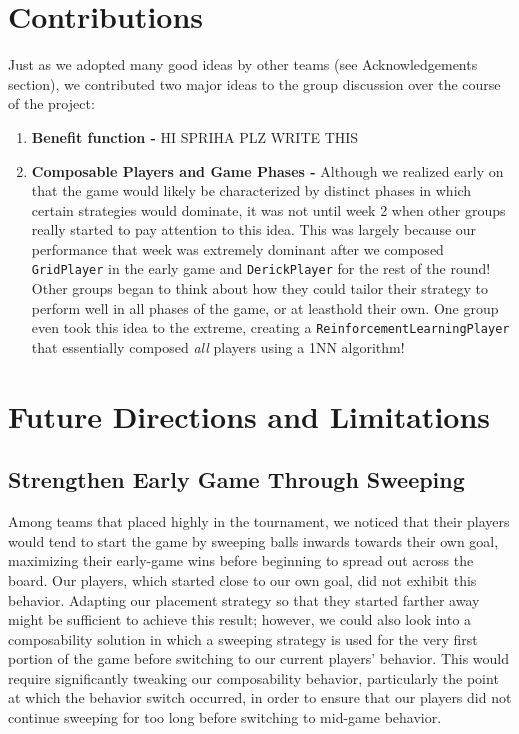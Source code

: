 \documentclass[
10pt, %
letterpaper, %
oneside, %
headinclude,footinclude, %
english
]{article}
\begin{document}
\lipsum[3]

\section{Contributions}

Just as we adopted many good ideas by other teams (see Acknowledgements section), we contributed two major ideas to the group discussion over the course of the project:

\begin{enumerate}
  \item \textbf{Benefit function - } HI SPRIHA PLZ WRITE THIS
  \item \textbf{Composable Players and Game Phases - } Although we realized early on that the game would likely be characterized by distinct phases in which certain strategies would dominate, it was not until week 2 when other groups really started to pay attention to this idea. This was largely because our performance that week was extremely dominant after we composed \texttt{GridPlayer} in the early game and \texttt{DerickPlayer} for the rest of the round! Other groups began to think about how they could tailor their strategy to perform well in all phases of the game, or at leasthold their own. One group even took this idea to the extreme, creating a \texttt{ReinforcementLearningPlayer} that essentially composed \textit{all} players using a 1NN algorithm!
\end{enumerate}

\section{Future Directions and Limitations}

\subsection{Strengthen Early Game Through Sweeping}
Among teams that placed highly in the tournament, we noticed that their players would tend to start the game by sweeping balls inwards towards their own goal, maximizing their early-game wins before beginning to spread out across the board. Our players, which started close to our own goal, did not exhibit this behavior. Adapting our placement strategy so that they started farther away might be sufficient to achieve this result; however, we could also look into a composability solution in which a sweeping strategy is used for the very first portion of the game before switching to our current players' behavior. This would require significantly tweaking our composability behavior, particularly the point at which the behavior switch occurred, in order to ensure that our players did not continue sweeping for too long before switching to mid-game behavior.
\end{document}
